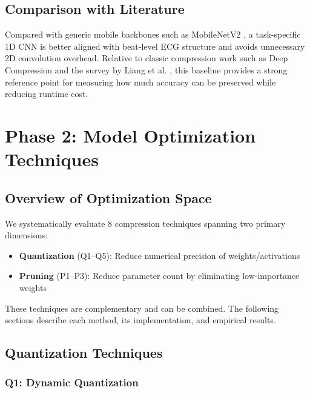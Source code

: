 \documentclass[12pt, a4paper]{article}
\begin{document}
\subsection{Comparison with Literature}

Compared with generic mobile backbones such as MobileNetV2 \cite{sandler2018mobilenetv2}, a task-specific 1D CNN is better aligned with beat-level ECG structure and avoids unnecessary 2D convolution overhead. Relative to classic compression work such as Deep Compression \cite{han2015deepcompression} and the survey by Liang et al. \cite{liang2021survey}, this baseline provides a strong reference point for measuring how much accuracy can be preserved while reducing runtime cost.

\section{Phase 2: Model Optimization Techniques}

\subsection{Overview of Optimization Space}

We systematically evaluate 8 compression techniques spanning two primary dimensions:

\begin{itemize}
    \item \textbf{Quantization} (Q1–Q5): Reduce numerical precision of weights/activations
    \item \textbf{Pruning} (P1–P3): Reduce parameter count by eliminating low-importance weights
\end{itemize}

These techniques are complementary and can be combined. The following sections describe each method, its implementation, and empirical results.

\newpage
\subsection{Quantization Techniques}

\subsubsection{Q1: Dynamic Quantization}
\end{document}
